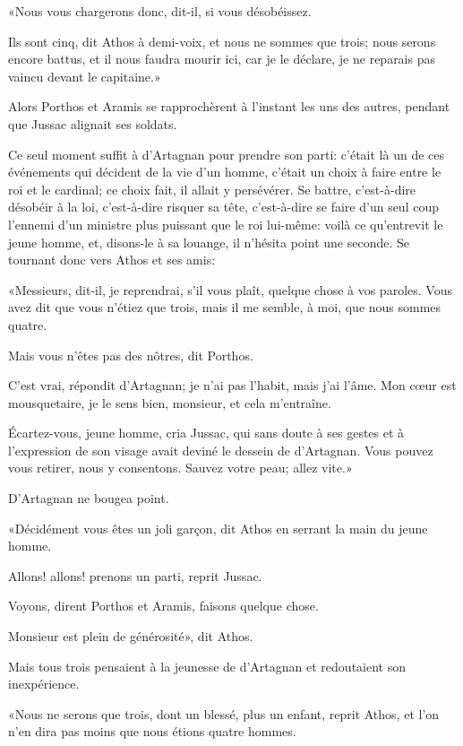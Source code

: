 «Nous vous chargerons donc, dit-il, si vous désobéissez. 

\speak  Ils sont cinq, dit Athos à demi-voix, et nous ne sommes que trois; nous serons encore battus, et il nous faudra mourir ici, car je le déclare, je ne reparais pas vaincu devant le capitaine.» 

Alors Porthos et Aramis se rapprochèrent à l'instant les uns des autres, pendant que Jussac alignait ses soldats. 

Ce seul moment suffit à d'Artagnan pour prendre son parti: c'était là un de ces événements qui décident de la vie d'un homme, c'était un choix à faire entre le roi et le cardinal; ce choix fait, il allait y persévérer. Se battre, c'est-à-dire désobéir à la loi, c'est-à-dire risquer sa tête, c'est-à-dire se faire d'un seul coup l'ennemi d'un ministre plus puissant que le roi lui-même: voilà ce qu'entrevit le jeune homme, et, disons-le à sa louange, il n'hésita point une seconde. Se tournant donc vers Athos et ses amis: 

«Messieurs, dit-il, je reprendrai, s'il vous plaît, quelque chose à vos paroles. Vous avez dit que vous n'étiez que trois, mais il me semble, à moi, que nous sommes quatre. 

\speak  Mais vous n'êtes pas des nôtres, dit Porthos. 

\speak  C'est vrai, répondit d'Artagnan; je n'ai pas l'habit, mais j'ai l'âme. Mon cœur est mousquetaire, je le sens bien, monsieur, et cela m'entraîne. 

\speak  Écartez-vous, jeune homme, cria Jussac, qui sans doute à ses gestes et à l'expression de son visage avait deviné le dessein de d'Artagnan. Vous pouvez vous retirer, nous y consentons. Sauvez votre peau; allez vite.» 

D'Artagnan ne bougea point. 

«Décidément vous êtes un joli garçon, dit Athos en serrant la main du jeune homme. 

\speak  Allons! allons! prenons un parti, reprit Jussac. 

\speak  Voyons, dirent Porthos et Aramis, faisons quelque chose. 

\speak  Monsieur est plein de générosité», dit Athos. 

Mais tous trois pensaient à la jeunesse de d'Artagnan et redoutaient son inexpérience. 

«Nous ne serons que trois, dont un blessé, plus un enfant, reprit Athos, et l'on n'en dira pas moins que nous étions quatre hommes. 

